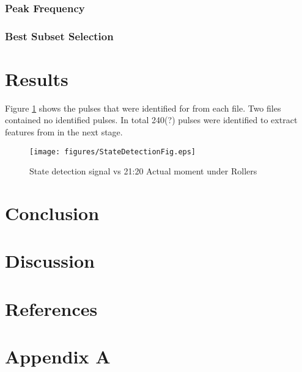 \documentclass{article}
\begin{document}
\subsubsection{Peak Frequency}
\subsubsection{Best Subset Selection}

\newpage  
\section{Results}
Figure \ref{fig:StateDetection} shows the pulses that were identified for from each file. Two files contained no identified pulses. In total 240(?) pulses were identified to extract features from in the next stage.

\begin{figure}[h!]
    \centering
    \texttt{[image: figures/StateDetectionFig.eps]}
    \caption{State detection signal vs 21:20 Actual moment under Rollers}
    \label{fig:StateDetection}
\end{figure}

\newpage  
\section{Conclusion}

\newpage 
\section{Discussion} 

\newpage  
\section{References} 

 

\newpage  
\section{Appendix A}
\end{document}
